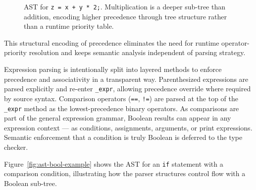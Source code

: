 \begin{figure}[H]
\centering
{}
\caption{AST for \texttt{z = x + y * 2;}. Multiplication is a deeper sub-tree
than addition, encoding higher precedence through tree structure rather than
a runtime priority table.}
\label{fig:ast-example}
\end{figure}

This structural encoding of precedence eliminates the need for runtime
operator-priority resolution and keeps semantic analysis independent of
parsing strategy.

Expression parsing is intentionally split into layered methods to enforce
precedence and associativity in a transparent way. Parenthesized expressions
are parsed explicitly and re-enter \texttt{\_expr}, allowing precedence
override where required by source syntax. Comparison operators (\texttt{==},
\texttt{!=}) are parsed at the top of the \texttt{\_expr} method as the
lowest-precedence binary operators. As comparisons are part of the
general expression grammar, Boolean results can appear in any expression
context --- as conditions, assignments, arguments, or print expressions.
Semantic enforcement that a condition is truly Boolean is deferred to the
type checker.

Figure~\ref{fig:ast-bool-example} shows the AST for an \texttt{if} statement
with a comparison condition, illustrating how the parser structures control flow
with a Boolean sub-tree.

